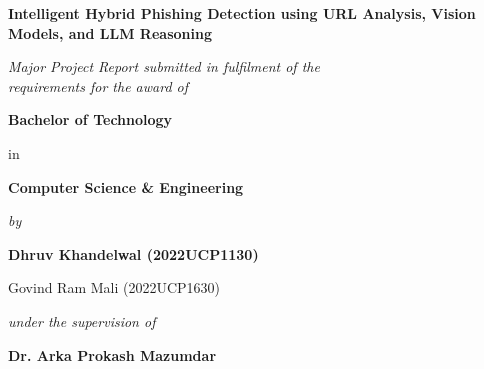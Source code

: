 \documentclass[12pt,a4paper]{report}
\begin{document}

\begin{titlepage}
    \centering

    \vspace*{1cm}

    {\Large\bfseries Intelligent Hybrid Phishing Detection using URL Analysis, Vision Models, and LLM Reasoning\par}

    \vspace{1cm}

    {\itshape Major Project Report submitted in fulfilment of the\\
    requirements for the award of\par}

    \vspace{0.6cm}

    {\large\bfseries Bachelor of Technology\par}

    \vspace{0.3cm}

    {\large in\par}

    \vspace{0.3cm}

    {\large\bfseries Computer Science \& Engineering\par}

\vspace{1.2cm}

{\itshape by\par}

\vspace{0.6cm}

{\large\bfseries
Dhruv Khandelwal (2022UCP1130)\par
Govind Ram Mali (2022UCP1630)\par}

\vspace{1.2cm}

{\itshape under the supervision of\par}

\vspace{0.5cm}

{\large\bfseries Dr. Arka Prokash Mazumdar\par}
    \vspace{1cm}


\end{titlepage}
\end{document}
